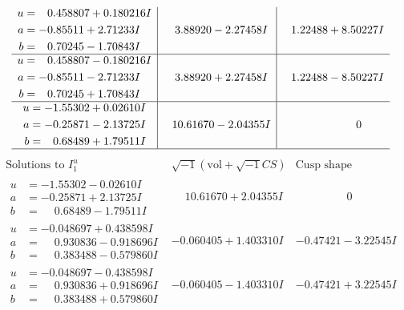 \documentclass[1p]{elsarticle_modified}
\theoremstyle{definition}
\newcommand{\I}{\sqrt{-1}}
\begin{document}
$$\begin{array}{c|c|c}
\begin{aligned}
u &= \phantom{-}0.458807 + 0.180216 I \\
a &= -0.85511 + 2.71233 I \\
b &= \phantom{-}0.70245 - 1.70843 I\end{aligned}
 & \phantom{-}3.88920 - 2.27458 I & \phantom{-}1.22488 + 8.50227 I \\ \hline\begin{aligned}
u &= \phantom{-}0.458807 - 0.180216 I \\
a &= -0.85511 - 2.71233 I \\
b &= \phantom{-}0.70245 + 1.70843 I\end{aligned}
 & \phantom{-}3.88920 + 2.27458 I & \phantom{-}1.22488 - 8.50227 I \\ \hline\begin{aligned}
u &= -1.55302 + 0.02610 I \\
a &= -0.25871 - 2.13725 I \\
b &= \phantom{-}0.68489 + 1.79511 I\end{aligned}
 & \phantom{-}10.61670 - 2.04355 I & \phantom{-0.000000 } 0\\
 \hline 
 \end{array}$$\newpage$$\begin{array}{c|c|c}  
\text{Solutions to }I^u_{1}& \I (\text{vol} + \sqrt{-1}CS) & \text{Cusp shape}\\
 \hline 
\begin{aligned}
u &= -1.55302 - 0.02610 I \\
a &= -0.25871 + 2.13725 I \\
b &= \phantom{-}0.68489 - 1.79511 I\end{aligned}
 & \phantom{-}10.61670 + 2.04355 I & \phantom{-0.000000 } 0 \\ \hline\begin{aligned}
u &= -0.048697 + 0.438598 I \\
a &= \phantom{-}0.930836 - 0.918696 I \\
b &= \phantom{-}0.383488 - 0.579860 I\end{aligned}
 & -0.060405 + 1.403310 I & -0.47421 - 3.22545 I \\ \hline\begin{aligned}
u &= -0.048697 - 0.438598 I \\
a &= \phantom{-}0.930836 + 0.918696 I \\
b &= \phantom{-}0.383488 + 0.579860 I\end{aligned}
 & -0.060405 - 1.403310 I & -0.47421 + 3.22545 I \\ \hline\begin{aligned}

\end{aligned}
\end{array}$$
\end{document}
